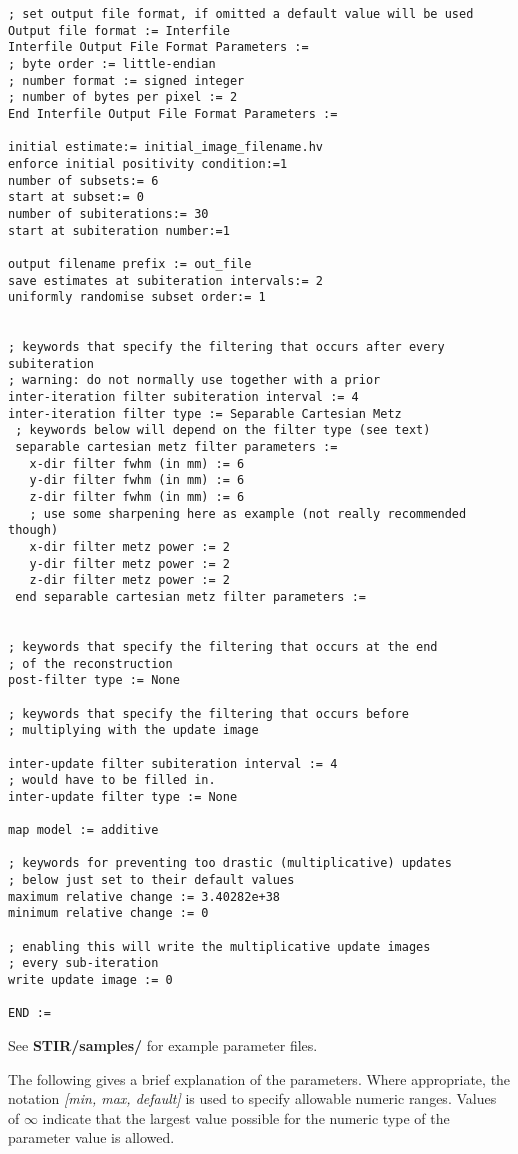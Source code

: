\documentclass{article}
\begin{document}
{{\begin{verbatim}
; set output file format, if omitted a default value will be used
Output file format := Interfile 
Interfile Output File Format Parameters := 
; byte order := little-endian 
; number format := signed integer 
; number of bytes per pixel := 2 
End Interfile Output File Format Parameters :=

initial estimate:= initial_image_filename.hv
enforce initial positivity condition:=1
number of subsets:= 6
start at subset:= 0
number of subiterations:= 30
start at subiteration number:=1

output filename prefix := out_file
save estimates at subiteration intervals:= 2
uniformly randomise subset order:= 1


; keywords that specify the filtering that occurs after every subiteration
; warning: do not normally use together with a prior
inter-iteration filter subiteration interval := 4
inter-iteration filter type := Separable Cartesian Metz
 ; keywords below will depend on the filter type (see text)
 separable cartesian metz filter parameters := 
   x-dir filter fwhm (in mm) := 6 
   y-dir filter fwhm (in mm) := 6 
   z-dir filter fwhm (in mm) := 6 
   ; use some sharpening here as example (not really recommended though)
   x-dir filter metz power := 2 
   y-dir filter metz power := 2 
   z-dir filter metz power := 2 
 end separable cartesian metz filter parameters := 


; keywords that specify the filtering that occurs at the end
; of the reconstruction
post-filter type := None

; keywords that specify the filtering that occurs before 
; multiplying with the update image

inter-update filter subiteration interval := 4
; would have to be filled in.
inter-update filter type := None

map model := additive

; keywords for preventing too drastic (multiplicative) updates
; below just set to their default values
maximum relative change := 3.40282e+38
minimum relative change := 0

; enabling this will write the multiplicative update images 
; every sub-iteration
write update image := 0

END :=
\end{verbatim}
}

See \textbf{STIR/samples/} for example parameter files.

The following gives a brief explanation of the parameters. Where 
appropriate, the notation \textit{[min, max, default]} is used to 
specify allowable numeric ranges. Values of \textit{\ensuremath{\infty}} indicate 
that the largest value possible for the numeric type of the parameter 
value is allowed.

}
\end{document}
